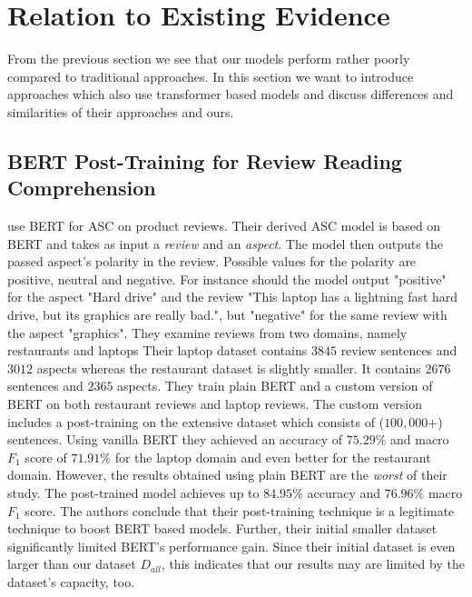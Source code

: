 \chapter{Relation to Existing Evidence}
\label{chp:relation_to_existing_evidence}
From the previous section we see that our models perform rather poorly compared to traditional approaches.
In this section we want to introduce approaches which also use transformer based models and discuss differences and similarities of their approaches and ours.

\section{BERT Post-Training for Review Reading Comprehension}
\Textcite{Xu:2019} use \ac{BERT} for \ac{ASC} on product reviews.
Their derived \ac{ASC} model is based on \ac{BERT} and takes as input a \textit{review} and an \textit{aspect}.
The model then outputs the passed aspect's polarity in the review.
Possible values for the polarity are positive, neutral and negative.
For instance should the model output "positive" for the aspect "Hard drive" and the review "This laptop has a lightning fast hard drive, but its graphics are really bad.", but "negative" for the same review with the aspect "graphics".
They examine reviews from two domains, namely restaurants and laptops
Their laptop dataset contains $3845$ review sentences and $3012$ aspects whereas the restaurant dataset is slightly smaller.
It contains $2676$ sentences and $2365$ aspects.
They train plain \ac{BERT} and a custom version of \ac{BERT} on both restaurant reviews and laptop reviews.
The custom version includes a post-training on the extensive dataset which consists of ($100,000$+) sentences.
Using vanilla \ac{BERT} they achieved an accuracy of $75.29\%$ and macro $F_1$ score of $71.91\%$ for the laptop domain and even better for the restaurant domain.
However, the results obtained using plain \ac{BERT} are the \textit{worst} of their study.
The post-trained model achieves up to $84.95\%$ accuracy and $76.96\%$ macro $F_1$ score.
The authors conclude that their post-training technique is a legitimate technique to boost \ac{BERT} based models.
Further, their initial smaller dataset significantly limited \ac{BERT}'s performance gain.
Since their initial dataset is even larger than our dataset $D_{all}$, this indicates that our results may are limited by the dataset's capacity, too.

